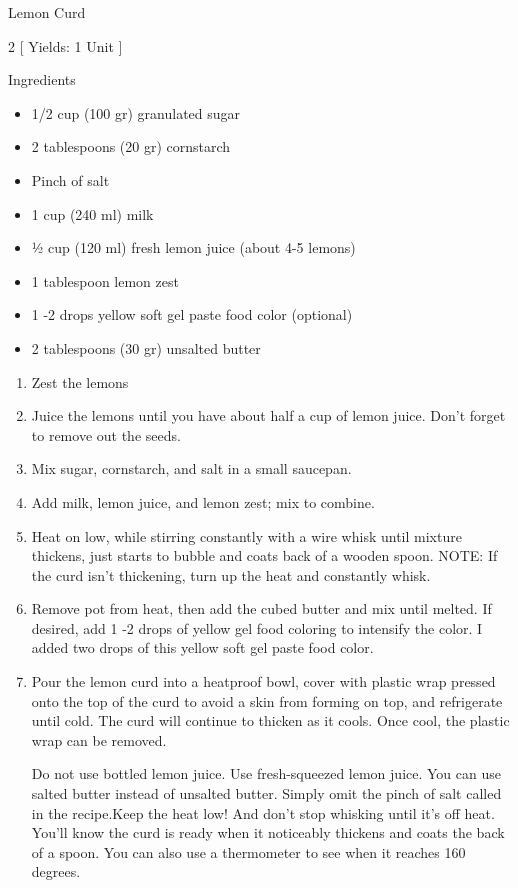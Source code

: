 \begin{Large}
    Lemon Curd
\end{Large}

\begin{scriptsize}
\begin{multicols}{2}
[
\vspace{1em}
Yields: 1 Unit
\vspace{-1.5em}
]

Ingredients
\begin{itemize}
    \item 1/2 cup (100 gr) granulated sugar
    \item 2 tablespoons (20 gr) cornstarch
    \item Pinch of salt
    \item 1 cup (240 ml) milk
    \item 1⁄2 cup (120 ml) fresh lemon juice (about 4-5 lemons)
    \item 1 tablespoon lemon zest
    \item 1 -2 drops yellow soft gel paste food color (optional)
    \item 2 tablespoons (30 gr) unsalted butter
\end{itemize}
\end{multicols}
\end{scriptsize}

\begin{footnotesize}
\begin{enumerate}
    \item Zest the lemons
    \item Juice the lemons until you have about half a cup of lemon juice. Don't forget to remove out the seeds.
    \item Mix sugar, cornstarch, and salt in a small saucepan.
    \item Add milk, lemon juice, and lemon zest; mix to combine.
    \item Heat on low, while stirring constantly with a wire whisk until mixture thickens, just starts to bubble and coats back of a wooden spoon. NOTE: If the curd isn’t thickening, turn up the heat and constantly whisk.
    \item Remove pot from heat, then add the cubed butter and mix until melted. If desired, add 1 -2 drops of yellow gel food coloring to intensify the color. I added two drops of this yellow soft gel paste food color.
    \item Pour the lemon curd into a heatproof bowl, cover with plastic wrap pressed onto the top of the curd to avoid a skin from forming on top, and refrigerate until cold. The curd will continue to thicken as it cools. Once cool, the plastic wrap can be removed.

Do not use bottled lemon juice. Use fresh-squeezed lemon juice.
You can use salted butter instead of unsalted butter. Simply omit the pinch of salt called in the
recipe.Keep the heat low! And don't stop whisking until it's off heat.
You'll know the curd is ready when it noticeably thickens and coats the back of a spoon. You can
also use a thermometer to see when it reaches 160 degrees.
\end{enumerate}
\end{footnotesize}

\vspace{2em}
